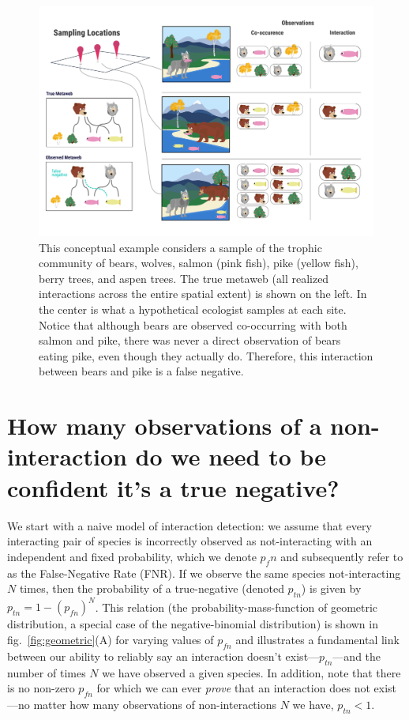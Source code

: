 \documentclass[10pt,oneside]{article}
\makeatletter
\def\maxwidth{\ifdim\Gin@nat@width>\linewidth\linewidth
\else\Gin@nat@width\fi}
\let\Oldincludegraphics\includegraphics
\renewcommand{\includegraphics}[1]{\Oldincludegraphics[width=\maxwidth]{#1}}
\makeatother
\begin{document}
\begin{figure}
\hypertarget{fig:concept}{%
\centering
\includegraphics{./figures/concept.png}
\caption{This conceptual example considers a sample of the trophic
community of bears, wolves, salmon (pink fish), pike (yellow fish),
berry trees, and aspen trees. The true metaweb (all realized
interactions across the entire spatial extent) is shown on the left. In
the center is what a hypothetical ecologist samples at each site. Notice
that although bears are observed co-occurring with both salmon and pike,
there was never a direct observation of bears eating pike, even though
they actually do. Therefore, this interaction between bears and pike is
a false negative.}\label{fig:concept}
}
\end{figure}

\hypertarget{how-many-observations-of-a-non-interaction-do-we-need-to-be-confident-its-a-true-negative}{%
\section{How many observations of a non-interaction do we need to be
confident it's a true
negative?}\label{how-many-observations-of-a-non-interaction-do-we-need-to-be-confident-its-a-true-negative}}

We start with a naive model of interaction detection: we assume that
every interacting pair of species is incorrectly observed as
not-interacting with an independent and fixed probability, which we
denote \(p_fn\) and subsequently refer to as the False-Negative Rate
(FNR). If we observe the same species not-interacting \(N\) times, then
the probability of a true-negative (denoted \(p_{tn}\)) is given by
\(p_{tn}=1-(p_{fn})^N\). This relation (the probability-mass-function of
geometric distribution, a special case of the negative-binomial
distribution) is shown in fig.~\ref{fig:geometric}(A) for varying values
of \(p_{fn}\) and illustrates a fundamental link between our ability to
reliably say an interaction doesn't exist---\(p_{tn}\)---and the number
of times \(N\) we have observed a given species. In addition, note that
there is no non-zero \(p_{fn}\) for which we can ever \emph{prove} that
an interaction does not exist---no matter how many observations of
non-interactions \(N\) we have, \(p_{tn}<1\).
\end{document}
